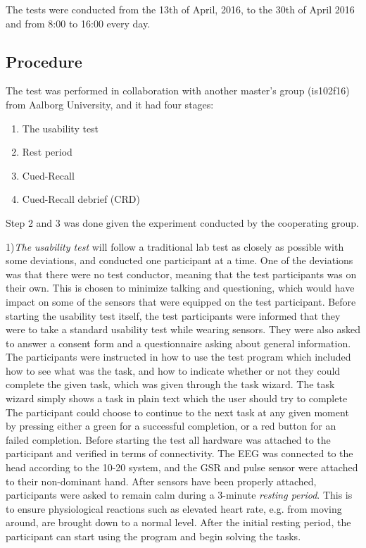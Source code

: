 The tests were conducted from the 13th of April, 2016, to the 30th of April 2016 and from 8:00 to 16:00 every day. 

\subsection{Procedure}
The test was performed in collaboration with another master's group (is102f16) from Aalborg University, and it had four stages:
\begin{enumerate}
\item The usability test
\item Rest period
\item Cued-Recall
\item Cued-Recall debrief (CRD)
\end{enumerate}
Step 2 and 3 was done given the experiment conducted by the cooperating group.

1)\textit{The usability test} will follow a traditional lab test as closely as possible with some deviations, and conducted one participant at a time. 
One of the deviations was that there were no test conductor, meaning that the test participants was on their own. This is chosen to minimize talking and questioning, which would have impact on some of the sensors that were equipped on the test participant.
Before starting the usability test itself, the test participants were informed that they were to take a standard usability test while wearing sensors.
They were also asked to answer a consent form and a questionnaire asking about general information.  
The participants were instructed in how to use the test program which included how to see what was the task, and how to indicate whether or not they
could complete the given task, which was given through the task wizard. The task wizard simply shows a task in plain text which the user should try to complete The participant could choose to continue to the next task at any given moment by pressing either a green for a successful completion, or a red button for an failed completion. 
Before starting the test all hardware was attached to the participant and verified in
terms of connectivity.  The EEG was connected to the head according to the 10-20 system\cite{eeg_tech_10_20}, and the
GSR and pulse sensor were attached to their non-dominant hand.
After sensors have been properly attached, participants were asked to remain calm during a 3-minute \textit{resting
  period}. This is to ensure physiological reactions such as elevated heart rate, e.g. from moving around, are brought
down to a normal level. After the initial resting period, the participant can start using the program and begin solving the tasks. 

